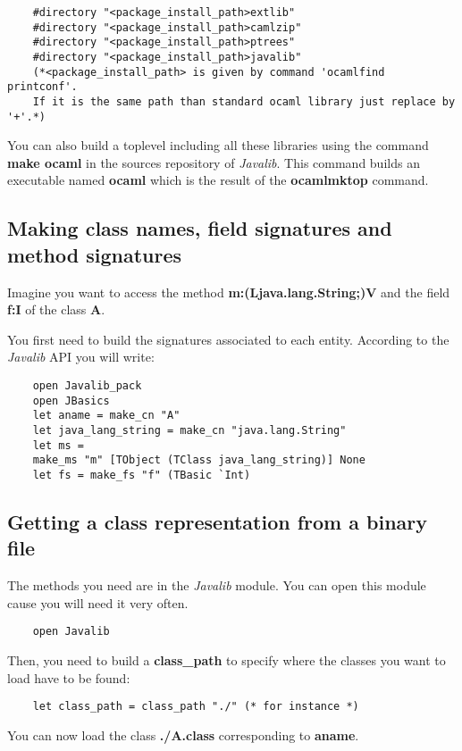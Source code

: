 \documentclass{article}
\begin{document}
\begin{verbatim}
    #directory "<package_install_path>extlib"
    #directory "<package_install_path>camlzip"
    #directory "<package_install_path>ptrees"
    #directory "<package_install_path>javalib"
    (*<package_install_path> is given by command 'ocamlfind printconf'. 
    If it is the same path than standard ocaml library just replace by '+'.*)
\end{verbatim}
You can also build a toplevel including all these libraries using
the command \textbf{make ocaml} in the sources repository of
\emph{Javalib}. This command builds an executable named
\textbf{ocaml} which is the result of the \textbf{ocamlmktop}
command.

\subsection{Making class names, field signatures and method signatures}

Imagine you want to access the method
\textbf{m:(Ljava.lang.String;)V} and the field \textbf{f:I} of the
class \textbf{A}.

You first need to build the signatures associated to each entity.
According to the \emph{Javalib} API you will write:

\begin{verbatim}
    open Javalib_pack
    open JBasics
    let aname = make_cn "A"
    let java_lang_string = make_cn "java.lang.String"
    let ms =
    make_ms "m" [TObject (TClass java_lang_string)] None
    let fs = make_fs "f" (TBasic `Int)
\end{verbatim}
\subsection{Getting a class representation from a binary file}

The methods you need are in the \emph{Javalib} module. You can open
this module cause you will need it very often.

\begin{verbatim}
    open Javalib
\end{verbatim}
Then, you need to build a \textbf{class\_path} to specify where the
classes you want to load have to be found:

\begin{verbatim}
    let class_path = class_path "./" (* for instance *)
\end{verbatim}
You can now load the class \textbf{./A.class} corresponding to
\textbf{aname}.
\end{document}

